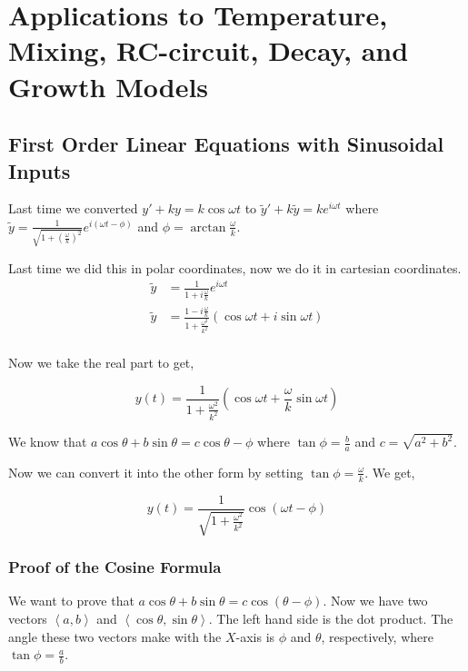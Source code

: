 

\chapter{Applications to Temperature, Mixing, RC-circuit, Decay, and Growth Models} 

\bigbreak

\section{First Order Linear Equations with Sinusoidal Inputs}

Last time we converted $y' + ky = k \cos \omega t$
to $\tilde{y}' + k\tilde{y} = k e^{i \omega t}$
where $\tilde{y} = \frac{1}{\sqrt{1 + \left( \frac{\omega}{k} \right)^2}} e^{i(\omega t - \phi)}$
and $\phi = \arctan \frac{\omega}{k}$.


Last time we did this in polar coordinates, now we do it in cartesian coordinates.
\begin{align*}
	\tilde{y} & = \frac{1}{1 + i \frac{\omega}{k}} e^{i \omega t} \\
	\tilde{y} & = \frac{1 - i \frac{\omega}{k}}{1 + \frac{\omega^2}{k^2}} (\cos \omega t + i \sin \omega t) \\
\end{align*}

Now we take the real part to get, 

$$ y(t) = \frac{1}{1 + \frac{\omega^2}{k^2}} \left( \cos \omega t + \frac{\omega}{k} \sin \omega t \right) $$

We know that $a \cos \theta + b \sin \theta = c \cos \theta - \phi$ where $\tan \phi = \frac{b}{a}$ and $c = \sqrt{a^2 + b^2}$.

Now we can convert it into the other form by setting $\tan \phi = \frac{\omega}{k}$.
We get, 

$$ y(t) = \frac{1}{\sqrt{1 + \frac{\omega^2}{k^2}}} \cos(\omega t - \phi) $$


\subsection{Proof of the Cosine Formula}

We want to prove that $a\cos \theta + b\sin \theta = c \cos (\theta - \phi)$.
Now we have two vectors $\left< a, b \right>$ and $\left< \cos \theta, \sin \theta \right>$.
The left hand side is the dot product.
The angle these two vectors make with the $X$-axis is $\phi$ and $\theta$, respectively, where $\tan \phi = \frac{a}{b}$.

